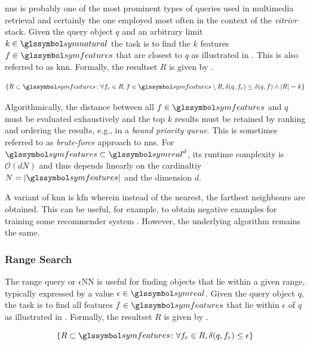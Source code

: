 \acrshort{nns} is probably one of the most prominent types of queries used in multimedia retrieval and certainly the one employed most often in the context of the \emph{vitrivr} \cite{Rossetto:2016vitrivr,Gasser:2019multimodal} stack. Given the query object $q$ and an arbitrary limit $k \in \symnatural$ the task is to find the $k$ features $f \in \symfeatures$ that are closest to $q$ as illustrated in . This is also referred to as \acrfull{knn}. Formally, the resultset $R$ is given by .

\begin{equation}
    \label{eq:knn}
    \lbrace R \subset \symfeatures \colon \forall f_r \in R, f \in \symfeatures \setminus R, \delta(q,f_r) \leq \delta(q,f) \wedge |R| = k \rbrace
\end{equation}

Algorithmically, the distance between all $f \in \symfeatures$ and $q$ must be evaluated exhaustively and the top $k$ results must be retained by ranking and ordering the results, e.g., in a \emph{bound priority queue}. This is sometimes referred to as \emph{brute-force} approach to \acrshort{nns}. For $\symfeatures \subset \symreal^d$, its runtime complexity is $\mathcal{O}(dN)$ and thus depends linearly on the cardinaltiy $N = |\symfeatures|$ and the dimension $d$. 

A variant of \acrshort{knn} is \acrfull{kfn} wherein instead of the nearest, the farthest neighbours are obtained. This can be useful, for example, to obtain negative examples for training some recommender system \cite{Pagh:2015Approximate}. However, the underlying algorithm remains the same.

\subsubsection{Range Search}

The range query or $\epsilon$NN is useful for finding objects that lie within a given range, typically expressed by a value $\epsilon \in \symreal$. Given the query object $q$, the task is to find all features $f \in \symfeatures$ that lie within $\epsilon$ of $q$ as illustrated in . Formally, the resultset $R$ is given by .

\begin{equation}
    \label{eq:epsilonnn}
    \lbrace R \subset \symfeatures \colon \forall f_r \in R, \delta(q,f_r) \leq \epsilon \rbrace
\end{equation}


